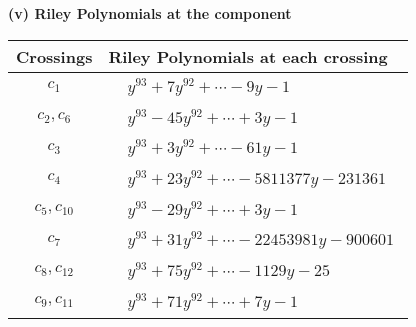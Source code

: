 \documentclass[1p]{elsarticle_modified}
\theoremstyle{definition}
\begin{document}
\newpage\renewcommand{\arraystretch}{1}
\flushleft \textbf{(v) Riley Polynomials at the component}\newline \\
\begin{tabular}{m{50pt}|m{274pt}}
Crossings & \hspace{64pt}Riley Polynomials at each crossing \\
\hline $$\begin{aligned}c_{1}\end{aligned}$$&$\begin{aligned}
&y^{93}+7 y^{92}+\cdots-9 y-1
\end{aligned}$\\
\hline $$\begin{aligned}c_{2},c_{6}\end{aligned}$$&$\begin{aligned}
&y^{93}-45 y^{92}+\cdots+3 y-1
\end{aligned}$\\
\hline $$\begin{aligned}c_{3}\end{aligned}$$&$\begin{aligned}
&y^{93}+3 y^{92}+\cdots-61 y-1
\end{aligned}$\\
\hline $$\begin{aligned}c_{4}\end{aligned}$$&$\begin{aligned}
&y^{93}+23 y^{92}+\cdots-5811377 y-231361
\end{aligned}$\\
\hline $$\begin{aligned}c_{5},c_{10}\end{aligned}$$&$\begin{aligned}
&y^{93}-29 y^{92}+\cdots+3 y-1
\end{aligned}$\\
\hline $$\begin{aligned}c_{7}\end{aligned}$$&$\begin{aligned}
&y^{93}+31 y^{92}+\cdots-22453981 y-900601
\end{aligned}$\\
\hline $$\begin{aligned}c_{8},c_{12}\end{aligned}$$&$\begin{aligned}
&y^{93}+75 y^{92}+\cdots-1129 y-25
\end{aligned}$\\
\hline $$\begin{aligned}c_{9},c_{11}\end{aligned}$$&$\begin{aligned}
&y^{93}+71 y^{92}+\cdots+7 y-1
\end{aligned}$\\
\hline
\end{tabular}\\~\\
\end{document}
